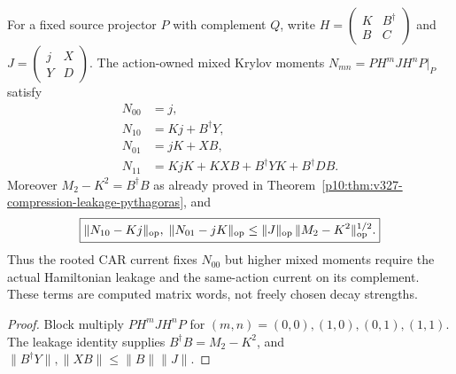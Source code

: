 \documentclass[12pt,a4paper]{article}
\begin{document}
\begin{proposition}
\label{p10:prop:v376-first-mixed-moment-leakage}
For a fixed source projector $P$ with complement $Q$, write
$H=\left(\begin{smallmatrix}K&B^\dagger\\ B&C\end{smallmatrix}\right)$
and
$J=\left(\begin{smallmatrix}j&X\\ Y&D\end{smallmatrix}\right)$.
The action-owned mixed Krylov moments
$N_{mn}=P H^m J H^nP|_{P}$ satisfy
\[
\boxed{\begin{aligned}
N_{00}&=j,\\
N_{10}&=Kj+B^\dagger Y,\\
N_{01}&=jK+XB,\\
N_{11}&=KjK+KXB+B^\dagger YK+B^\dagger DB.
\end{aligned}}
\]
Moreover $M_2-K^2=B^\dagger B$ as already proved in
Theorem~\ref{p10:thm:v327-compression-leakage-pythagoras}, and
\[
 \boxed{\|N_{10}-Kj\|_{\rm op},\;
 \|N_{01}-jK\|_{\rm op}
 \le \|J\|_{\rm op}\,\|M_2-K^2\|_{\rm op}^{1/2}.}
\]
Thus the rooted CAR current fixes $N_{00}$ but higher mixed
moments require the actual Hamiltonian leakage and the same-action
current on its complement. These terms are computed matrix words,
not freely chosen decay strengths.
\end{proposition}
\begin{proof}
Block multiply $PH^m JH^nP$ for $(m,n)=(0,0),(1,0),
(0,1),(1,1)$. The leakage identity supplies
$B^\dagger B=M_2-K^2$, and
$\|B^\dagger Y\|,\|XB\|\le\|B\|\|J\|$.
\end{proof}
\end{document}
